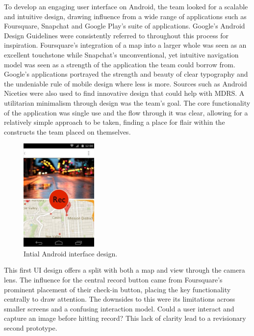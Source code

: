 \documentclass{l3proj}
\begin{document}
To develop an engaging user interface on Android, the team looked for a scalable and intuitive design, drawing influence from a wide range of applications such as Foursquare, Snapchat and Google Play’s suite of applications. Google's Android Design Guidelines were consistently referred to throughout this process for inspiration.  Foursquare's integration of a map into a larger whole was seen as an excellent touchstone while Snapchat's unconventional, yet intuitive navigation model was seen as a strength of the application the team could borrow from. Google's applications portrayed the strength and beauty of clear typography and the undeniable rule of mobile design where less is more. Sources such as Android Niceties were also used to find innovative design that could help with MDRS. A utilitarian minimalism through design was the team's goal. The core functionality of the application was single use and the flow through it was clear, allowing for a relatively simple approach to be taken, finding a place for flair within the constructs the team placed on themselves.

\begin{figure}[ht!]
\centering
\includegraphics[width=0.34\textwidth]{images/android-digital-prototype-1.jpg}
\caption{Intial Android interface design.}
\end{figure}

This first UI design offers a split with both a map and view through the camera
lens. The influence for the central record button came from Foursquare’s
prominent placement of their check-in button, placing the key functionality
centrally to draw attention. The downsides to this were its limitations across
smaller screens and a confusing interaction model. Could a user interact and
capture an image before hitting record? This lack of clarity lead to a
revisionary second prototype.
\end{document}
